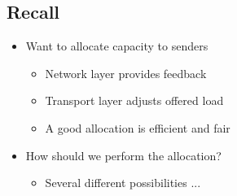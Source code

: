 \documentclass[12pt]{ctexart}   %
\begin{document}
	\subsection{Recall}
	\begin{itemize}
		\item Want to allocate capacity to senders
		\begin{itemize}
			\item Network layer provides feedback
			\item Transport layer adjusts offered load
			\item A good allocation is efficient and fair
		\end{itemize}
		
		\item How should we perform the allocation?
		\begin{itemize}
			\item Several different possibilities ...
		\end{itemize}
	\end{itemize}
	
\end{document}
